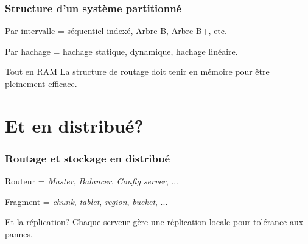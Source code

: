 \begin{frame}
\frametitle{Structure d'un système partitionné}

      
\begin{redbullet}
  \item Par intervalle = séquentiel indexé, \alert{Arbre B}, Arbre B+, etc. 
  \item Par hachage = hachage statique, dynamique, \alert{hachage linéaire}.
\end{redbullet}

\vfill

\begin{remblock}{Tout en RAM}
La structure de routage doit tenir en mémoire pour être pleinement efficace.
\end{remblock}
\end{frame}



\section{Et en distribué?}


\begin{frame}
\frametitle{Routage et stockage en distribué}

      
\vfill

\begin{redbullet}
  \item Routeur = \textit{Master}, \textit{Balancer}, \textit{Config server}, ...
  \item Fragment = \textit{chunk}, \textit{tablet}, \textit{region}, \textit{bucket}, ...
\end{redbullet}

\vfill

\begin{remblock}{Et la réplication?}
Chaque serveur gère une réplication locale pour tolérance aux pannes.
\end{remblock}
\end{frame}

